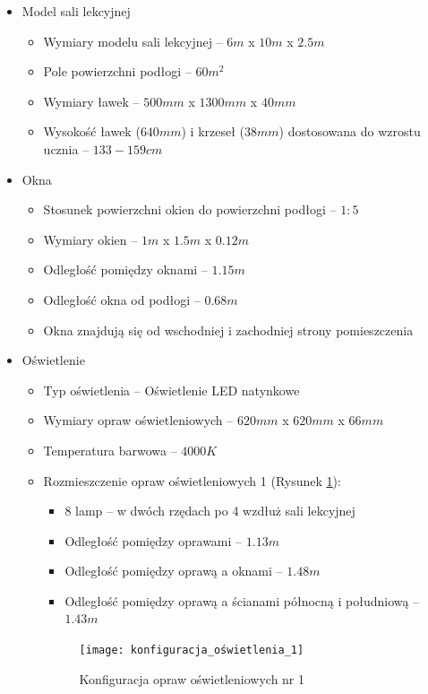 \documentclass[a4paper,12pt]{article}
\begin{document}
	\begin{itemize}
		\item Model sali lekcyjnej
		\begin{itemize}
			\item Wymiary modelu sali lekcyjnej -- $6m$ x $10m$ x $2.5m$
			\item Pole powierzchni podłogi -- $60m^2$
			\item Wymiary ławek -- $500mm$ x $1300mm$ x $40mm$
			\item Wysokość ławek ($640mm$) i krzeseł ($38mm$) dostosowana do wzrostu ucznia -- $133-159cm$
		\end{itemize}
		\item Okna
		\begin{itemize}
			\item Stosunek powierzchni okien do powierzchni podłogi -- $1:5$
			\item Wymiary okien -- $1m$ x $1.5m$ x $0.12m$
			\item Odległość pomiędzy oknami -- $1.15m$
			\item Odległość okna od podłogi -- $0.68m$
			\item Okna znajdują się od wschodniej i zachodniej strony pomieszczenia
		\end{itemize}
		\item Oświetlenie
		\begin{itemize}
			\item Typ oświetlenia -- Oświetlenie LED natynkowe
			\item Wymiary opraw oświetleniowych -- $620mm$ x $620mm$ x $66mm$
			\item Temperatura barwowa -- $4000K$
			\item Rozmieszczenie opraw oświetleniowych 1 (Rysunek \ref{konfiguracja_opraw_1}):
			\begin{itemize}
				\item 8 lamp -- w dwóch rzędach po 4 wzdłuż sali lekcyjnej
				\item Odległość pomiędzy oprawami -- $1.13m$
				\item Odległość pomiędzy oprawą a oknami -- $1.48m$
				\item Odległość pomiędzy oprawą a ścianami północną i południową -- $1.43m$
			\end{itemize}
		
		\begin{figure}[h]
			\centering
			\texttt{[image: konfiguracja\_oświetlenia\_1]}
			\caption{Konfiguracja opraw oświetleniowych nr 1}
			\label{konfiguracja_opraw_1}
		\end{figure}
	

\end{itemize}
\end{itemize}
\end{document}
